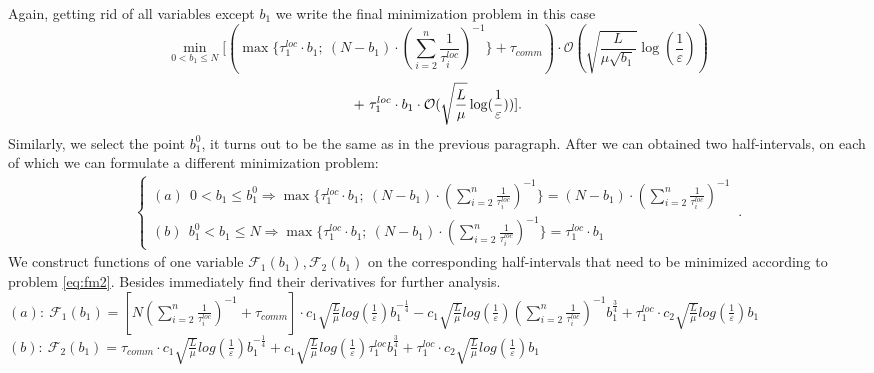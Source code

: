 \documentclass{article}
\begin{document}
Again, getting rid of all variables except $b_1$ we write the final minimization problem in this case
\begin{equation}
    \label{eq:fm2}
      \underset{0 < b_1 \leq N}{\min}[(\max\{\tau_1^{loc}\cdot b_1; ~(N-b_1) \cdot (\sum\limits_{i = 2}^{n} \frac{1}{\tau_i^{loc}} )^{-1}\} + \tau_{comm}) \cdot \mathcal O(\sqrt{\frac{L}{\mu \sqrt{b_1}}}\log(\frac{1}{\varepsilon}))
\end{equation}
\begin{equation}
     \notag
     + ~
    \tau_1^{loc}\cdot b_1 \cdot \mathcal O(\sqrt{\frac{L}{\mu}}\log(\frac{1}{\varepsilon}))]. 
\end{equation}
Similarly, we select the point $b_1^0$, it turns out to be the same as in the previous paragraph. After we can obtained two half-intervals, on each of which we can formulate a different minimization problem:
\begin{eqnarray}
\label{half-int}
    \begin{cases}
    (a) ~ ~ 0 < b_1 \leq b_1^0 \Rightarrow \max\{\tau_1^{loc}\cdot b_1; ~(N-b_1) \cdot (\sum\limits_{i = 2}^{n} \frac{1}{\tau_i^{loc}} )^{-1}\} = 
    (N-b_1) \cdot (\sum\limits_{i = 2}^{n} \frac{1}{\tau_i^{loc}})^{-1}
    \\
    (b) ~ ~ b_1^0 <  b_1 \leq N \Rightarrow \max\{\tau_1^{loc}\cdot b_1; ~(N-b_1) \cdot (\sum\limits_{i = 2}^{n} \frac{1}{\tau_i^{loc}} )^{-1}\} = \tau_1^{loc}\cdot b_1
    \end{cases}\,.
\end{eqnarray}
We construct functions of one variable $\mathcal{F}_1(b_1), \mathcal{F}_2(b_1)$ on the corresponding half-intervals that need to be minimized according to problem \eqref{eq:fm2}. Besides immediately find their derivatives for further analysis.\\
$(a): ~\mathcal{F}_1(b_1) = [N (\sum\limits_{i = 2}^{n} \frac{1}{\tau_i^{loc}})^{-1} + \tau_{comm}]\cdot 
c_1 \sqrt{\frac{L}{\mu}}log (\frac{1}{\varepsilon})  b_1^{-\frac{1}{4}} - 
c_1  \sqrt{\frac{L}{\mu}}log (\frac{1}{\varepsilon})(\sum\limits_{i =
2}^{n} \frac{1}{\tau_i^{loc}})^{-1} b_1^{\frac{3}{4}}  + \tau_1^{loc}\cdot c_2  \sqrt{\frac{L}{\mu}}log (\frac{1}{\varepsilon}) b_1 $\\
$(b): ~\mathcal{F}_2(b_1) = \tau_{comm}\cdot 
c_1 \sqrt{\frac{L}{\mu}}log (\frac{1}{\varepsilon})  b_1^{-\frac{1}{4}} + 
c_1  \sqrt{\frac{L}{\mu}}log (\frac{1}{\varepsilon})\tau_1^{loc} b_1^{\frac{3}{4}}  + \tau_1^{loc}\cdot c_2  \sqrt{\frac{L}{\mu}}log (\frac{1}{\varepsilon}) b_1 $
\\
\end{document}
